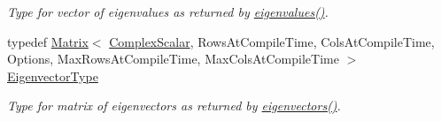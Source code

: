 \begin{DoxyCompactItemize}
\begin{DoxyCompactList}\small\item\em Type for vector of eigenvalues as returned by \hyperlink{group___eigenvalues___module_a10c25c7620e7faedcd39991cce3a757b}{eigenvalues()}. \end{DoxyCompactList}\item 
typedef \hyperlink{group___core___module_class_eigen_1_1_matrix}{Matrix}$<$ \hyperlink{group___eigenvalues___module_a3604c99a69fac3bee42c88cb2b589143}{Complex\+Scalar}, Rows\+At\+Compile\+Time, Cols\+At\+Compile\+Time, Options, Max\+Rows\+At\+Compile\+Time, Max\+Cols\+At\+Compile\+Time $>$ \hyperlink{group___eigenvalues___module_a67cd4d20590abfd86b2639c4c8ea3dd6}{Eigenvector\+Type}
\begin{DoxyCompactList}\small\item\em Type for matrix of eigenvectors as returned by \hyperlink{group___eigenvalues___module_a3aa5e27800349990778da8fa532c1270}{eigenvectors()}. \end{DoxyCompactList}\end{DoxyCompactItemize}
